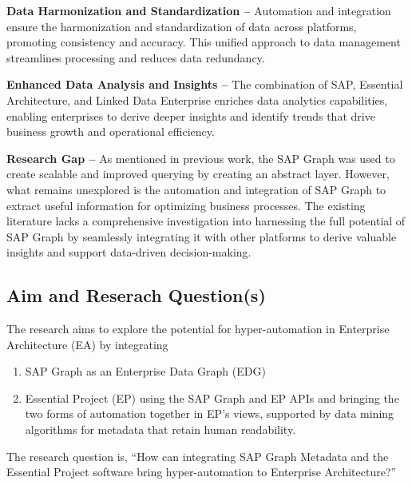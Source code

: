 \documentclass{article}
\begin{document}
\textbf{Data Harmonization and Standardization –} Automation and integration ensure the harmonization and standardization of data across platforms, promoting consistency and accuracy. This unified approach to data management streamlines processing and reduces data redundancy.

\textbf{Enhanced Data Analysis and Insights –} The combination of SAP, Essential Architecture, and Linked Data Enterprise enriches data analytics capabilities, enabling enterprises to derive deeper insights and identify trends that drive business growth and operational efficiency.

\textbf{Research Gap –} As mentioned in previous work, the SAP Graph was used to create scalable and improved querying by creating an abstract layer. However, what remains unexplored is the automation and integration of SAP Graph to extract useful information for optimizing business processes. The existing literature lacks a comprehensive investigation into harnessing the full potential of SAP Graph by seamlessly integrating it with other platforms to derive valuable insights and support data-driven decision-making.

\maketitle
\subsection{Aim and Reserach Question(s)}
The research aims to explore the potential for hyper-automation in Enterprise Architecture (EA) by integrating

\begin{enumerate}
    \item SAP Graph as an Enterprise Data Graph (EDG)
    \item Essential Project (EP) using the SAP Graph and EP APIs and bringing the two forms of automation together in EP's views, supported by data mining algorithms for metadata that retain human readability.
\end{enumerate}

The research question is, “How can integrating SAP Graph Metadata and the Essential Project software bring hyper-automation to Enterprise Architecture?”


\maketitle
\end{document}
